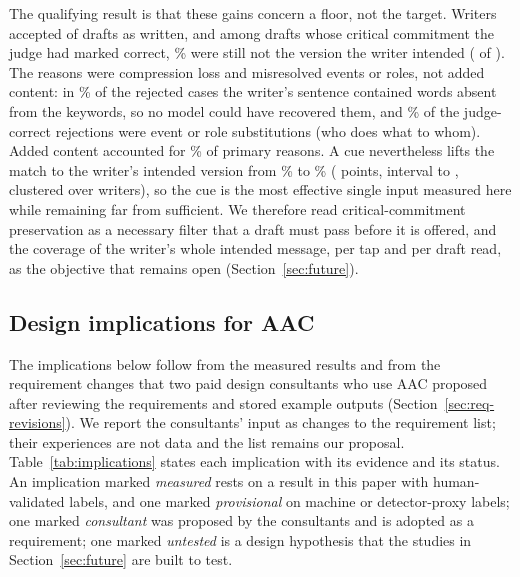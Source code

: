 The qualifying result is that these gains concern a floor, not the target.
Writers accepted \jmpOneEightAcceptYesK{} of \jmpOneEightAcceptN{} drafts as written, and among drafts whose critical commitment the judge had marked correct, \jmwmRightROne{}\% were still not the version the writer intended (\jmwmRightROneK{} of \jmwmRightROneN{}).
The reasons were compression loss and misresolved events or roles, not added content: in \jmwmDroppedUnrecShare{}\% of the rejected cases the writer's sentence contained words absent from the keywords, so no model could have recovered them, and \jmwmRightSubst{}\% of the judge-correct rejections were event or role substitutions (who does what to whom).
Added content accounted for \jmwmAdded{}\% of primary reasons.
A cue nevertheless lifts the match to the writer's intended version from \jmpOneEightMatchBare{}\% to \jmpOneEightMatchChip{}\% (\jmpOneEightCueGain{} points, interval \jmpOneEightCueGainLo{} to \jmpOneEightCueGainHi{}, clustered over \jmpOneEightWriters{} writers), so the cue is the most effective single input measured here while remaining far from sufficient.
We therefore read critical-commitment preservation as a necessary filter that a draft must pass before it is offered, and the coverage of the writer's whole intended message, per tap and per draft read, as the objective that remains open (Section~\ref{sec:future}).

\subsection{Design implications for AAC}\label{sec:implications}

The implications below follow from the measured results and from the requirement changes that two paid design consultants who use AAC proposed after reviewing the requirements and stored example outputs (Section~\ref{sec:req-revisions}).
We report the consultants' input as changes to the requirement list; their experiences are not data and the list remains our proposal.
Table~\ref{tab:implications} states each implication with its evidence and its status.
An implication marked \emph{measured} rests on a result in this paper with human-validated labels, and one marked \emph{provisional} on machine or detector-proxy labels; one marked \emph{consultant} was proposed by the consultants and is adopted as a requirement; one marked \emph{untested} is a design hypothesis that the studies in Section~\ref{sec:future} are built to test.

